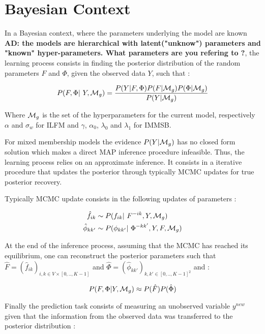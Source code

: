 \section{Bayesian Context}
\label{sec:inference}
In a Bayesian context, where the parameters underlying the model are known \textbf{AD: the models are hierarchical with latent("unknow") parameters and "known" hyper-parameters. What parameters are you refering to ?}, the learning process consists in finding the posterior distribution of the random parameters $F$ and $\Phi$, given the observed data $Y$, such that : 

\begin{equation}
    \p(F, \Phi | Y, \mg) = \frac{\p(Y|F,\Phi)\p(F|\mg)\p(\Phi|\mg)}{\p(Y|\mg)}
\end{equation}

Where $\mathcal{M}_g$ is the set of the hyperparameters for the current model, respectively $\alpha$ and $\sigma_w$ for ILFM and $\gamma$,  $\alpha_0$, $\lambda_0$ and $\lambda_1$ for IMMSB.


For mixed membership models the evidence $P(Y|\mathcal{M}_g)$ has no closed form solution which makes a direct MAP inference procedure infeasible. Thus, the learning process relies on an approximate inference. It consists in a iterative procedure that updates the posterior through typically MCMC updates for true posterior recovery.

Typically MCMC update consists in the following updates of parameters :  

\begin{align}
    \hat f_{ik} &\sim \p(f_{ik} | F^{-ik}, Y, \mg) \\
    \hat \phi_{kk'} &\sim \p(\phi_{kk'} | \Phi^{-kk'}, Y, F, \mg)
\end{align}

At the end of the inference process, assuming that the MCMC has reached its  equilibrium, one can reconstruct the posterior parameters such that $\hat F = (\hat f_{ik})_{i,k \in V\times[0,.., K-1]}$ and $\hat \Phi = (\hat \phi_{kk'})_{k,k' \in [0,.., K-1]^2}$ and :

\begin{equation}
    P(F, \Phi|Y, \mathcal{M}_g) \approx P(\hat F) P(\hat \Phi)
\end{equation}

Finally the prediction task consists of measuring an unobserved variable $y^{new}$ given that the information from the observed data was transferred to the posterior distribution : 


